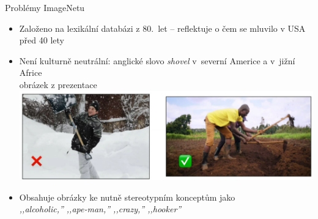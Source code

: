 \documentclass[aspectratio=169,dvipsnames]{beamer}
\begin{document}
\begin{frame}{Problémy ImageNetu}

    \begin{itemize}[<+->]

        \item Založeno na lexikální databázi z 80.\ let -- reflektuje o čem se
            mluvilo v USA před 40 lety

        \item Není kulturně neutrální: anglické slovo \emph{shovel} v~severní
            Americe a v~jižní Africe \\ {\tiny obrázek z prezentace
            \citet{liu-etal-2021-visually}} \\
            \includegraphics[scale=.35]{img/shovel.png}

        \item Obsahuje obrázky ke nutně stereotypním konceptům jako {\tiny \citep[str.\ 109]{crawford2021atlas}} \\
            \quad\it ,,alcoholic,'' ,,ape-­man,'' ,,crazy,'' ,,hooker''
    \end{itemize}

\end{frame}


\end{document}
